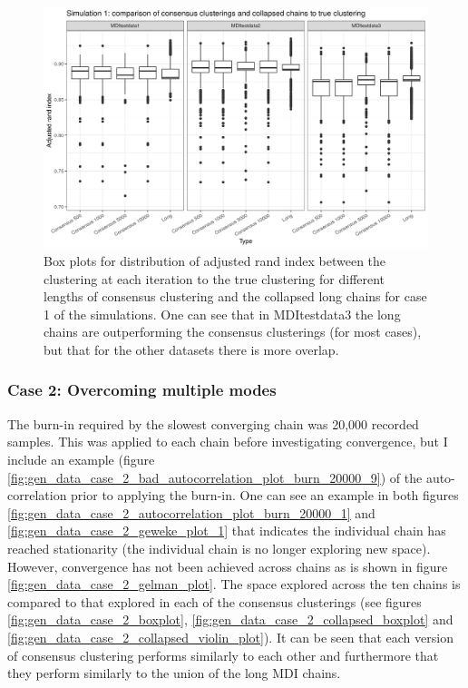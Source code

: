 \documentclass[12pt]{article} %
\begin{document}
		\begin{figure}[!htb]
			\centering
			\includegraphics[scale=0.65]{Images/Gen_data/Case_1/box_plot_ari_true_clustering_collapsed_long_burn_in.png}
			\caption{Box plots for distribution of adjusted rand index between the clustering at each iteration to the true clustering for different lengths of consensus clustering and the collapsed long chains for case 1 of the simulations. One can see that in MDItestdata3 the long chains are outperforming the consensus clusterings (for most cases), but that for the other datasets there is more overlap.}
			\label{fig:gen_data_case_1_collapsed_boxplot}
		\end{figure}
		

	
	\subsubsection{Case 2: Overcoming multiple modes} \label{sec:results:case_2}
	
	The burn-in required by the slowest converging chain was 20,000 recorded samples. This was applied to each chain before investigating convergence, but I include an example (figure \ref{fig:gen_data_case_2_bad_autocorrelation_plot_burn_20000_9}) of the auto-correlation prior to applying the burn-in. One can see an example in both figures \ref{fig:gen_data_case_2_autocorrelation_plot_burn_20000_1} and \ref{fig:gen_data_case_2_geweke_plot_1} that indicates the individual chain has reached stationarity (the individual chain is no longer exploring new space). However, convergence has not been achieved across chains as is shown in figure \ref{fig:gen_data_case_2_gelman_plot}. The space explored across the ten chains is compared to that explored in each of the consensus clusterings (see figures \ref{fig:gen_data_case_2_boxplot}, \ref{fig:gen_data_case_2_collapsed_boxplot} and \ref{fig:gen_data_case_2_collapsed_violin_plot}). It can be seen that each version of consensus clustering performs similarly to each other and furthermore that they perform similarly to the union of the long MDI chains.
	
\end{document}
